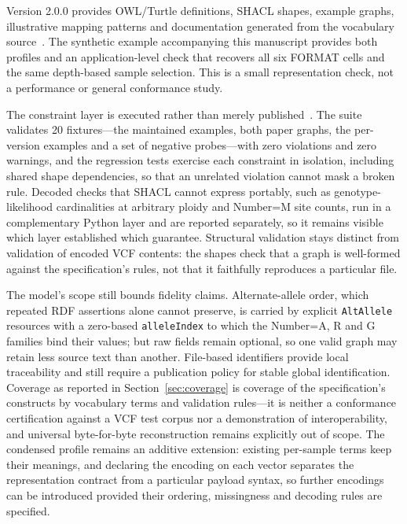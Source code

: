 \documentclass{ceurart}
\newcommand{\term}[1]{\texttt{#1}}
\begin{document}
Version 2.0.0 provides OWL/Turtle definitions, SHACL shapes, example graphs, illustrative mapping patterns and documentation generated from the vocabulary source~\cite{vcfc200}. The synthetic example accompanying this manuscript provides both profiles and an application-level check that recovers all six FORMAT cells and the same depth-based sample selection. This is a small representation check, not a performance or general conformance study.

The constraint layer is executed rather than merely published~\cite{shacl2017}. The suite validates 20 fixtures---the maintained examples, both paper graphs, the per-version examples and a set of negative probes---with zero violations and zero warnings, and the regression tests exercise each constraint in isolation, including shared shape dependencies, so that an unrelated violation cannot mask a broken rule. Decoded checks that SHACL cannot express portably, such as genotype-likelihood cardinalities at arbitrary ploidy and Number=M site counts, run in a complementary Python layer and are reported separately, so it remains visible which layer established which guarantee. Structural validation stays distinct from validation of encoded VCF contents: the shapes check that a graph is well-formed against the specification's rules, not that it faithfully reproduces a particular file.

The model's scope still bounds fidelity claims. Alternate-allele order, which repeated RDF assertions alone cannot preserve, is carried by explicit \term{AltAllele} resources with a zero-based \term{alleleIndex} to which the Number=A, R and G families bind their values; but raw fields remain optional, so one valid graph may retain less source text than another. File-based identifiers provide local traceability and still require a publication policy for stable global identification. Coverage as reported in Section~\ref{sec:coverage} is coverage of the specification's constructs by vocabulary terms and validation rules---it is neither a conformance certification against a VCF test corpus nor a demonstration of interoperability, and universal byte-for-byte reconstruction remains explicitly out of scope. The condensed profile remains an additive extension: existing per-sample terms keep their meanings, and declaring the encoding on each vector separates the representation contract from a particular payload syntax, so further encodings can be introduced provided their ordering, missingness and decoding rules are specified.
\end{document}
